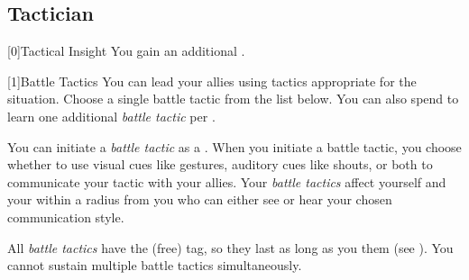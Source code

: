     \newpage
    \subsection{Tactician}

        [0]{Tactical Insight} You gain an additional .

        [1]{Battle Tactics}
        You can lead your allies using tactics appropriate for the situation.
        Choose a single battle tactic from the list below.
        You can also spend  to learn one additional \textit{battle tactic} per .

        You can initiate a \textit{battle tactic} as a .
        When you initiate a battle tactic, you choose whether to use visual cues like gestures, auditory cues like shouts, or both to communicate your tactic with your allies.
        Your \textit{battle tactics} affect yourself and your  within a \areahuge radius  from you who can either see or hear your chosen communication style.

        All \textit{battle tactics} have the  (free) tag, so they last as long as you  them (see ).
        You cannot sustain multiple battle tactics simultaneously.

